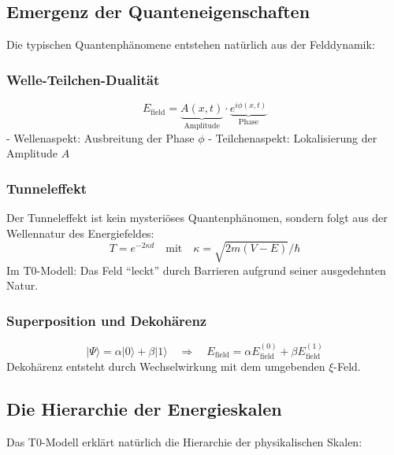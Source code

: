 \documentclass[12pt,a4paper]{article}
\newcommand{\xipar}{\ensuremath{\xi}}
\newcommand{\Efield}{E_\text{field}}
\begin{document}
	\subsection{Emergenz der Quanteneigenschaften}
	
	Die typischen Quantenphänomene entstehen natürlich aus der Felddynamik:
	
	\subsubsection{Welle-Teilchen-Dualität}
	\begin{equation}
		\Efield = \underbrace{A(x,t)}_{\text{Amplitude}} \cdot \underbrace{e^{i\phi(x,t)}}_{\text{Phase}}
	\end{equation}
	- Wellenaspekt: Ausbreitung der Phase $\phi$
	- Teilchenaspekt: Lokalisierung der Amplitude $A$
	
	\subsubsection{Tunneleffekt}
	Der Tunneleffekt ist kein mysteriöses Quantenphänomen, sondern folgt aus der Wellennatur des Energiefeldes:
	\begin{equation}
		T = e^{-2\kappa d} \quad \text{mit} \quad \kappa = \sqrt{2m(V-E)}/\hbar
	\end{equation}
	Im T0-Modell: Das Feld ``leckt'' durch Barrieren aufgrund seiner ausgedehnten Natur.
	
	\subsubsection{Superposition und Dekohärenz}
	\begin{equation}
		|\Psi\rangle = \alpha|0\rangle + \beta|1\rangle \quad \Rightarrow \quad \Efield = \alpha \Efield^{(0)} + \beta \Efield^{(1)}
	\end{equation}
	Dekohärenz entsteht durch Wechselwirkung mit dem umgebenden $\xipar$-Feld.
	
	\subsection{Die Hierarchie der Energieskalen}
	
	Das T0-Modell erklärt natürlich die Hierarchie der physikalischen Skalen:
	
\end{document}
